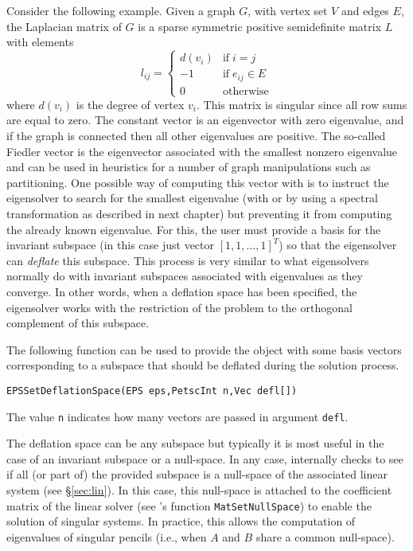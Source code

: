 Consider the following example. Given a graph $G$, with vertex set $V$ and edges $E$, the Laplacian matrix of $G$ is a sparse symmetric positive semidefinite matrix $L$ with elements
$$l_{ij}=\left\{\begin{array}{cl}
         d(v_i) & \mathrm{if}\;i=j\\
         -1 & \mathrm{if}\;e_{ij}\in E\\
         0&\mathrm{otherwise}
\end{array}\right.$$
where $d(v_i)$ is the degree of vertex $v_i$. This matrix is singular since all row sums are equal to zero. The constant vector is an eigenvector with zero eigenvalue, and if the graph is connected then all other eigenvalues are positive. The so-called Fiedler vector is the eigenvector associated with the smallest nonzero eigenvalue and can be used in heuristics for a number of graph manipulations such as partitioning. One possible way of computing this vector with \slepc is to instruct the eigensolver to search for the smallest eigenvalue (with  or by using a spectral transformation as described in next chapter) but preventing it from computing the already known eigenvalue. For this, the user must provide a basis for the invariant subspace (in this case just vector $[1,1,\ldots,1]^T$) so that the eigensolver can \emph{deflate} this subspace. This process is very similar to what eigensolvers normally do with invariant subspaces associated with eigenvalues as they converge. In other words, when a deflation space has been specified, the eigensolver works with the restriction of the problem to the orthogonal complement of this subspace.

The following function can be used to provide the  object with some basis vectors corresponding to a subspace that should be deflated during the solution process.
        \begin{Verbatim}[fontsize=\small]
        EPSSetDeflationSpace(EPS eps,PetscInt n,Vec defl[])
        \end{Verbatim}
The value \texttt{n} indicates how many vectors are passed in argument \texttt{defl}.

The deflation space can be any subspace but typically it is most useful in the case of an invariant subspace or a null-space. In any case, \slepc internally checks to see if all (or part of) the provided subspace is a null-space of the associated linear system (see \S\ref{sec:lin}). In this case, this null-space is attached to the coefficient matrix of the linear solver (see \petsc's function \texttt{MatSetNullSpace}) to enable the solution of singular systems. In practice, this allows the computation of eigenvalues of singular pencils (i.e., when $A$ and $B$ share a common null-space).

